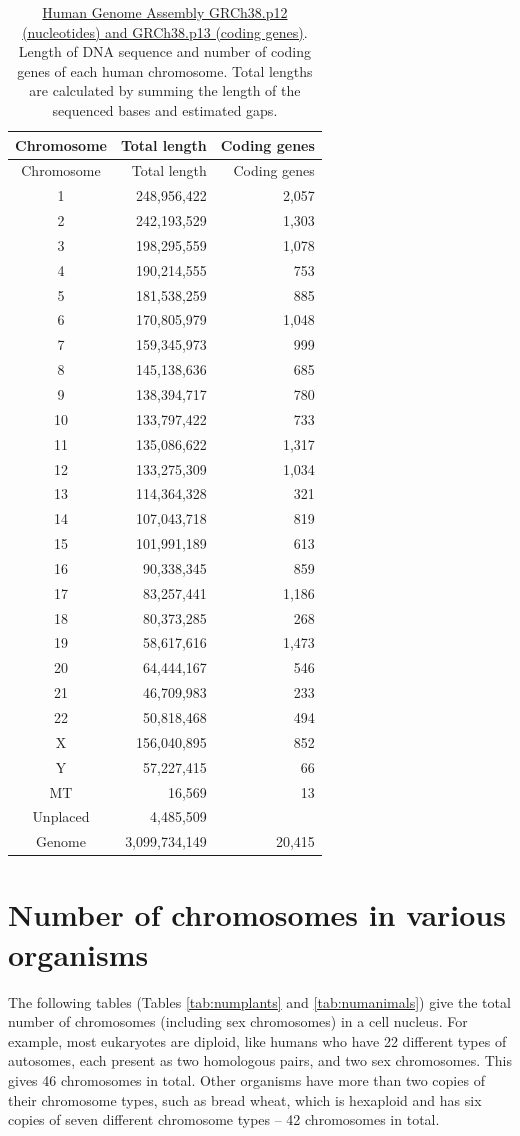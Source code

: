 \begin{longtable}[]{@{}crr@{}}
\caption{\label{tab:chr} \href{https://www.ncbi.nlm.nih.gov/grc/human/data}{Human Genome Assembly GRCh38.p12 (nucleotides) and GRCh38.p13 (coding genes)}. Length of DNA sequence and number of coding genes of each human chromosome. Total lengths are calculated by summing the length of the sequenced bases and estimated gaps.}\tabularnewline
\toprule
Chromosome & Total length & Coding genes\tabularnewline
\midrule
\endfirsthead
\toprule
Chromosome & Total length & Coding genes\tabularnewline
\midrule
\endhead
1 & 248,956,422 & 2,057\tabularnewline
2 & 242,193,529 & 1,303\tabularnewline
3 & 198,295,559 & 1,078\tabularnewline
4 & 190,214,555 & 753\tabularnewline
5 & 181,538,259 & 885\tabularnewline
6 & 170,805,979 & 1,048\tabularnewline
7 & 159,345,973 & 999\tabularnewline
8 & 145,138,636 & 685\tabularnewline
9 & 138,394,717 & 780\tabularnewline
10 & 133,797,422 & 733\tabularnewline
11 & 135,086,622 & 1,317\tabularnewline
12 & 133,275,309 & 1,034\tabularnewline
13 & 114,364,328 & 321\tabularnewline
14 & 107,043,718 & 819\tabularnewline
15 & 101,991,189 & 613\tabularnewline
16 & 90,338,345 & 859\tabularnewline
17 & 83,257,441 & 1,186\tabularnewline
18 & 80,373,285 & 268\tabularnewline
19 & 58,617,616 & 1,473\tabularnewline
20 & 64,444,167 & 546\tabularnewline
21 & 46,709,983 & 233\tabularnewline
22 & 50,818,468 & 494\tabularnewline
X & 156,040,895 & 852\tabularnewline
Y & 57,227,415 & 66\tabularnewline
MT & 16,569 & 13\tabularnewline
Unplaced & 4,485,509 &\tabularnewline
Genome & 3,099,734,149 & 20,415\tabularnewline
\bottomrule
\end{longtable}

\hypertarget{number-of-chromosomes-in-various-organisms}{%
\section{Number of chromosomes in various organisms}\label{number-of-chromosomes-in-various-organisms}}

The following tables (Tables \ref{tab:numplants} and \ref{tab:numanimals}) give the total number of chromosomes (including sex chromosomes) in a cell nucleus. For example, most eukaryotes are diploid, like humans who have 22 different types of autosomes, each present as two homologous pairs, and two sex chromosomes. This gives 46 chromosomes in total. Other organisms have more than two copies of their chromosome types, such as bread wheat, which is hexaploid and has six copies of seven different chromosome types -- 42 chromosomes in total.

